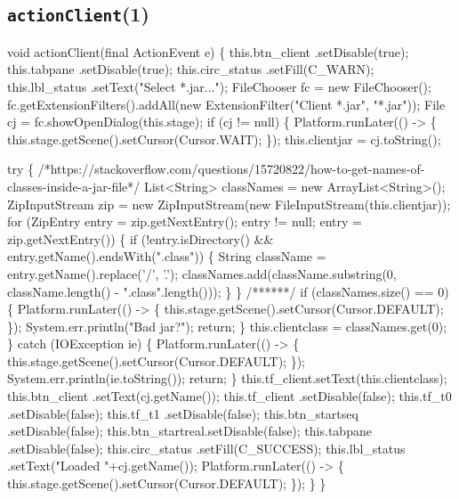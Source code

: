 \subsection{\texttt{actionClient}(1)}
\nwenddocs{}\endmoddef{}
void actionClient(final ActionEvent e) \{
  this.btn_client   .setDisable(true);
  this.tabpane      .setDisable(true);
  this.circ_status  .setFill(C_WARN);
  this.lbl_status   .setText("Select *.jar...");
  FileChooser fc = new FileChooser();
  fc.getExtensionFilters().addAll(new ExtensionFilter("Client *.jar", "*.jar"));
  File cj = fc.showOpenDialog(this.stage);
  if (cj != null) \{
    Platform.runLater(() -> \{
      this.stage.getScene().setCursor(Cursor.WAIT);
    \});
    this.clientjar = cj.toString();

    try \{
/*https://stackoverflow.com/questions/15720822/how-to-get-names-of-classes-inside-a-jar-file*/
List<String> classNames = new ArrayList<String>();
ZipInputStream zip = new ZipInputStream(new FileInputStream(this.clientjar));
for (ZipEntry entry = zip.getNextEntry(); entry != null; entry = zip.getNextEntry()) \{
  if (!entry.isDirectory() && entry.getName().endsWith(".class")) \{
    String className = entry.getName().replace('/', '.');
    classNames.add(className.substring(0, className.length() - ".class".length()));
  \}
\}
/******/
      if (classNames.size() == 0) \{
        Platform.runLater(() -> \{
          this.stage.getScene().setCursor(Cursor.DEFAULT);
        \});
        System.err.println("Bad jar?");
        return;
      \}
      this.clientclass = classNames.get(0);
    \} catch (IOException ie) \{
      Platform.runLater(() -> \{
        this.stage.getScene().setCursor(Cursor.DEFAULT);
      \});
      System.err.println(ie.toString());
      return;
    \}
    this.tf_client.setText(this.clientclass);
    this.btn_client   .setText(cj.getName());
    this.tf_client     .setDisable(false);
    this.tf_t0        .setDisable(false);
    this.tf_t1        .setDisable(false);
    this.btn_startseq .setDisable(false);
    this.btn_startreal.setDisable(false);
    this.tabpane      .setDisable(false);
    this.circ_status  .setFill(C_SUCCESS);
    this.lbl_status   .setText("Loaded "+cj.getName());
    Platform.runLater(() -> \{
      this.stage.getScene().setCursor(Cursor.DEFAULT);
    \});
  \}
\}
\nwendcode{}\nwdocspar

